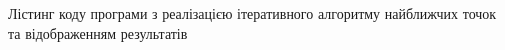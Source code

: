\append{}
Лістинг коду програми з
реалізацією ітеративного алгоритму найближчих точок та відображенням результатів
\lstset{inputencoding=utf8, extendedchars=\true}

